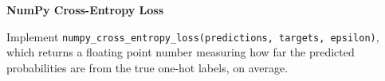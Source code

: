 \item {} \textbf{NumPy Cross-Entropy Loss}

Implement \texttt{numpy\_cross\_entropy\_loss(predictions, targets, epsilon)}, which returns a floating point number measuring how far the predicted probabilities are from the true one-hot labels, on average.